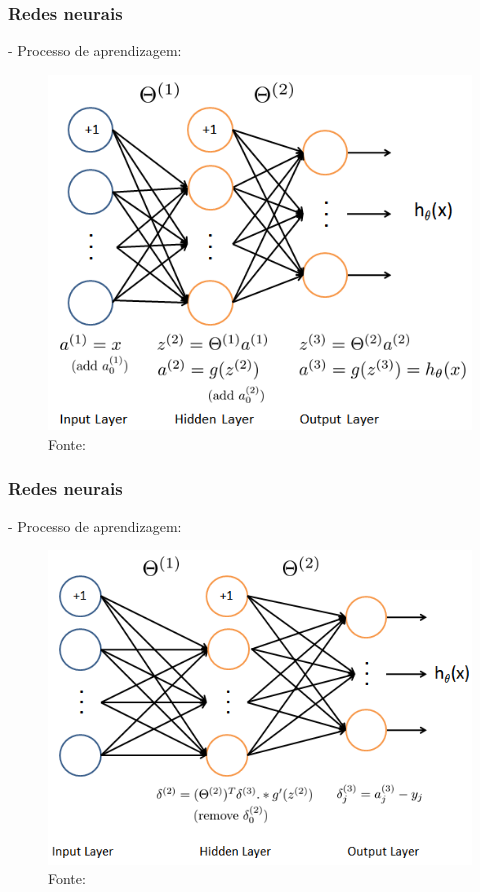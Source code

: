 \documentclass[10pt]{beamer}
\begin{document}
\begin{frame}[fragile]
  \frametitle{Redes neurais}

  - Processo de aprendizagem:

  \begin{figure}
    \begin{center}
      \includegraphics[scale=0.4]{img/redeneuralmulticlass}
    \end{center}
    \caption{Fonte: }
  \end{figure}
  
\end{frame}


\begin{frame}[fragile]
  \frametitle{Redes neurais}

  - Processo de aprendizagem:

  \begin{figure}
    \begin{center}
      \includegraphics[scale=0.42]{img/backpropagationalg}
    \end{center}
    \caption{Fonte: }
  \end{figure}
  
\end{frame}
\end{document}
